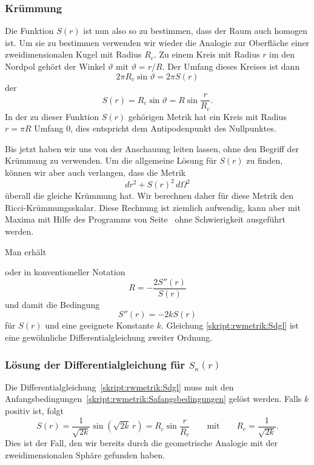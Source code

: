 \subsubsection{Krümmung}
Die Funktion $S(r)$ ist nun also so zu bestimmen, dass der Raum auch
homogen ist.
Um sie zu bestimmen verwenden wir wieder die Analogie zur Oberfläche
einer zweidimensionalen Kugel mit Radius $R_c$.
Zu einem Kreis mit Radius $r$ im den Nordpol gehört der Winkel
$\vartheta$ mit $\vartheta = r/R$.
Der Umfang dieses Kreises ist dann
\[
2\pi R_c\sin\vartheta
=
2\pi S(r)
\]
der
\[
S(r) = R_c\sin\vartheta=R\sin\frac{r}{R_c}.
\]
In der zu dieser Funktion $S(r)$ gehörigen Metrik hat ein Kreis mit 
Radius $r=\pi R$ Umfang $0$, dies entspricht dem Antipodenpunkt des
Nullpunktes.

Bis jetzt haben wir uns von der Anschauung leiten lassen, ohne den
Begriff der Krümmung zu verwenden.
Um die allgemeine Lösung für $S(r)$ zu finden, können wir
aber auch verlangen, dass die Metrik
\[
dr^2 + S(r)^2\,d\Omega^2
\]
überall die gleiche Krümmung hat.
Wir berechnen daher für diese Metrik den Ricci-Krümmungsskalar.
Diese Rechnung ist ziemlich aufwendig, kann aber mit Maxima
mit Hilfe des Programms von Seite~\pageref{skript:maxima:curvature}
ohne
Schwierigkeit ausgeführt werden.

Man erhält 

oder in konventioneller Notation
\[
R=
-\frac{2S''(r)}{S(r)}
\]
und damit die Bedingung
\begin{equation}
S''(r)=-2k S(r)
\label{skript:rwmetrik:Sdgl}
\end{equation}
für $S(r)$ und eine geeignete Konstante $k$.
Gleichung \eqref{skript:rwmetrik:Sdgl} ist eine gewöhnliche
Differentialgleichung zweiter Ordnung.

\subsubsection{Lösung der Differentialgleichung für $S_\kappa(r)$}
Die Differentialgleichung~\eqref{skript:rwmetrik:Sdgl}
muss mit den Anfangsbedingungen~\eqref{skript:rwmetrik:Safangsbedingungen}
gelöst werden.
Falls $k$ positiv ist, folgt
\begin{equation}
S(r)=\frac1{\sqrt{2k}}\sin(\sqrt{2k}\,r) = R_c\sin\frac{r}{R_c}
\qquad\text{mit}\qquad
R_c=\frac1{\sqrt{2k}}.
\label{skript:rwmetrik:sinloesung}
\end{equation}
Dies ist der Fall, den wir bereits durch die geometrische Analogie mit
der zweidimensionalen Sphäre gefunden haben.

